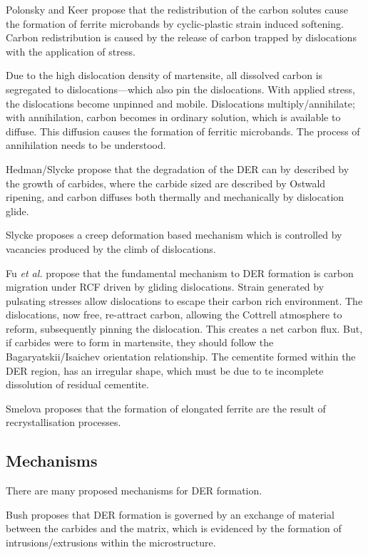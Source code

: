 \documentclass[a4paper]{article}
\begin{document}
Polonsky and Keer propose that the redistribution of the carbon
solutes cause the formation of ferrite microbands by 
cyclic-plastic strain induced softening. Carbon redistribution
is caused by the release of carbon trapped by dislocations with the
application of stress. 

Due to the high dislocation density of martensite, all dissolved
carbon is segregated to dislocations---which also pin the
dislocations. With applied stress, the dislocations become unpinned
and mobile. Dislocations multiply/annihilate; with annihilation,
carbon becomes in ordinary solution, which is available to
diffuse. This diffusion causes the formation of ferritic
microbands. The process of annihilation needs to be understood. 

Hedman/Slycke propose that the degradation of the DER can by
described by the growth of carbides, where the carbide sized are
described by Ostwald ripening, and carbon diffuses both thermally
and mechanically by dislocation glide. 

Slycke proposes a creep deformation based mechanism which is
controlled by vacancies produced by the climb of dislocations. 

Fu \emph{et al.} propose that the fundamental mechanism to DER formation
is carbon migration under RCF driven by gliding dislocations. Strain
generated by pulsating stresses allow dislocations to escape their
carbon rich environment. The dislocations, now free, re-attract
carbon, allowing the Cottrell atmosphere to reform, subsequently
pinning the dislocation. This creates a net carbon flux. But, if
carbides were to form in martensite, they should follow the
Bagaryatskii/Isaichev orientation relationship. The cementite formed
within the DER region, has an irregular shape, which must be due to
te incomplete dissolution of residual cementite. 

Smelova proposes that the formation of elongated ferrite are the
result of recrystallisation processes. 

\subsection{Mechanisms}
\label{sec:org2283d2a}

There are many proposed mechanisms for DER formation.

Bush proposes that DER formation is governed by an
exchange of material between the carbides and the matrix, which is
evidenced by the formation of intrusions/extrusions within the
microstructure. 
\end{document}
